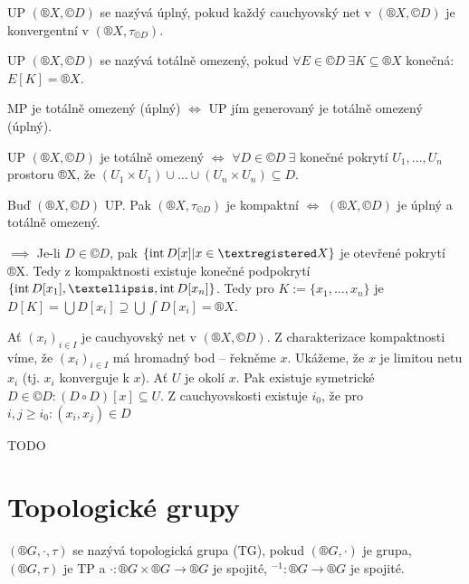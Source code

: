 \documentclass[12pt]{article}                   %
\begin{document}
        \begin{definice}
            UP $(®X, ©D)$ se nazývá úplný, pokud každý cauchyovský net v $(®X, ©D)$ je konvergentní v $(®X, \tau_{©D})$.

            UP $(®X, ©D)$ se nazývá totálně omezený, pokud $\forall E \in ©D\ \exists K \subseteq ®X$ konečná: $E[K] = ®X$.
        \end{definice}

        \begin{poznamka}
            MP je totálně omezený (úplný) $\Leftrightarrow$ UP jím generovaný je totálně omezený (úplný).
        \end{poznamka}

        \begin{poznamka}
            UP $(®X, ©D)$ je totálně omezený $\Leftrightarrow$ $\forall D \in ©D\ \exists$ konečné pokrytí $U_1, …, U_n$ prostoru ®X, že $(U_1 \times U_1) \cup … \cup (U_n \times U_n) \subseteq D$.
        \end{poznamka}

        \begin{veta}
            Buď $(®X, ©D)$ UP. Pak $(®X, \tau_{©D})$ je kompaktní $\Leftrightarrow$ $(®X, ©D)$ je úplný a totálně omezený.

            \begin{dukazin}
                $\implies$ Je-li $D \in ©D$, pak $\{\Int D[x] | x \in ®X\}$ je otevřené pokrytí ®X. Tedy z kompaktnosti existuje konečné podpokrytí $\{\Int D[x_1], …, \Int D[x_n]\}$. Tedy pro $K := \{x_1, …, x_n\}$ je $D[K] = \bigcup D[x_i] \supseteq \bigcup \int D[x_i] = ®X$.

                Ať $(x_i)_{i \in I}$ je cauchyovský net v $(®X, ©D)$. Z charakterizace kompaktnosti víme, že $(x_i)_{i \in I}$ má hromadný bod -- řekněme $x$. Ukážeme, že $x$ je limitou netu $x_i$ (tj. $x_i$ konverguje k $x$). Ať $U$ je okolí $x$. Pak existuje symetrické $D \in ©D: (D \circ D)[x] \subseteq U$. Z cauchyovskosti existuje $i_0$, že pro $i, j ≥ i_0: (x_i, x_j) \in D$

            \end{dukazin}
        \end{veta}

        TODO


\section{Topologické grupy}
    \begin{definice}
        $(®G, ·, \tau)$ se nazývá topologická grupa (TG), pokud $(®G, ·)$ je grupa, $(®G, \tau)$ je TP a $·: ®G \times ®G \rightarrow ®G$ je spojité, $^{-1}: ®G \rightarrow ®G$ je spojité.
    \end{definice}
\end{document}
